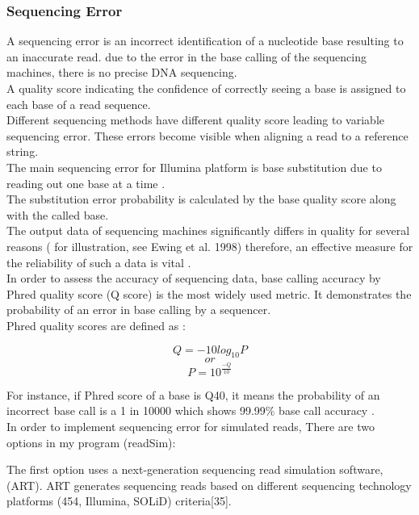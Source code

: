 \documentclass[11pt,a4paper]{report}
\begin{document}
\subsubsection{Sequencing Error}
 

A sequencing error is an incorrect identification of a nucleotide base resulting to an inaccurate read. 
due to the error in the base calling of the sequencing machines, there is no precise DNA sequencing. \\
A quality score indicating the confidence of correctly seeing a base is assigned to each base of a read sequence.\\
Different sequencing methods have different quality score leading to variable sequencing error. These errors become visible when aligning a read to a reference string.\\
The main sequencing error for Illumina platform is base substitution due to reading out one base at a time \cite{art}.\\

The substitution error probability is calculated by the base quality score along with the called base.\\


The output data of sequencing machines significantly differs in quality for several reasons ( for illustration, see Ewing et al. 1998) therefore, an effective measure for the reliability of such a data is vital \cite{phred1}.\\

In order to assess the accuracy of sequencing data, base calling accuracy by Phred quality score (Q score) is the most widely used metric. It demonstrates the probability of an error in base calling by a sequencer.\\

Phred quality scores are defined as \cite{phred2}:

$$ Q = -10  log_{10}P   $$
$$  or $$
$$ P = 10 ^ { \frac{-Q}{ 10 } } $$

For instance, if Phred score of a base is Q40, it means the probability of an incorrect base call is a 1 in 10000 which shows 99.99\% base call accuracy \cite{IlluminaPhred}. \\  

In order to implement sequencing error for simulated reads, There are two
options in my program (readSim):

The first option uses a next-generation sequencing read simulation software, (ART).
ART generates sequencing reads based on different sequencing technology platforms
(454, Illumina, SOLiD) criteria[35].
\end{document}
